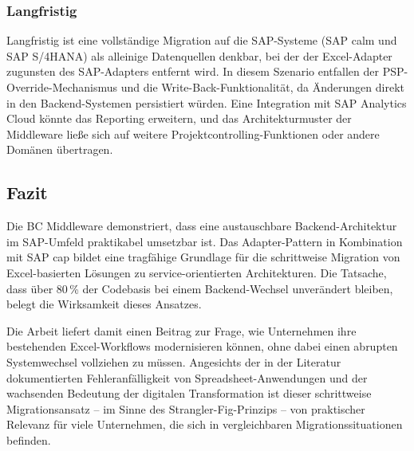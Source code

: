 \subsubsection{Langfristig}

Langfristig ist eine vollständige Migration auf die SAP-Systeme (SAP \gls{calm} und SAP S/4HANA) als alleinige Datenquellen denkbar, bei der der Excel-Adapter zugunsten des SAP-Adapters entfernt wird. In diesem Szenario entfallen der PSP-Override-Mechanismus und die Write-Back-Funktionalität, da Änderungen direkt in den Backend-Systemen persistiert würden. Eine Integration mit SAP Analytics Cloud könnte das Reporting erweitern, und das Architekturmuster der Middleware ließe sich auf weitere Projektcontrolling-Funktionen oder andere Domänen übertragen.

\subsection{Fazit}

Die BC Middleware demonstriert, dass eine austauschbare Backend-Architektur im SAP-Umfeld praktikabel umsetzbar ist. Das Adapter-Pattern in Kombination mit SAP \gls{cap} bildet eine tragfähige Grundlage für die schrittweise Migration von Excel-basierten Lösungen zu service-orientierten Architekturen. Die Tatsache, dass über 80\,\% der Codebasis bei einem Backend-Wechsel unverändert bleiben, belegt die Wirksamkeit dieses Ansatzes.

Die Arbeit liefert damit einen Beitrag zur Frage, wie Unternehmen ihre bestehenden Excel-Workflows modernisieren können, ohne dabei einen abrupten Systemwechsel vollziehen zu müssen. Angesichts der in der Literatur dokumentierten Fehleranfälligkeit von Spreadsheet-Anwendungen \citep{powell2009, panko2016} und der wachsenden Bedeutung der digitalen Transformation \citep{westerman2014} ist dieser schrittweise Migrationsansatz -- im Sinne des Strangler-Fig-Prinzips \citep{newman2021} -- von praktischer Relevanz für viele Unternehmen, die sich in vergleichbaren Migrationssituationen befinden.
